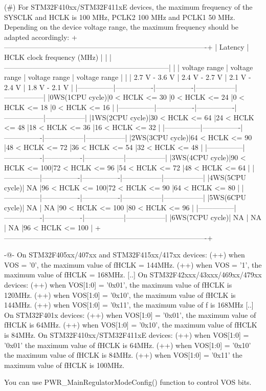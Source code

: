 \begin{DoxyVerb}
      (#) For STM32F410xx/STM32F411xE devices, the maximum frequency of the SYSCLK and HCLK is 100 MHz, 
          PCLK2 100 MHz and PCLK1 50 MHz. Depending on the device voltage range, the maximum 
          frequency should be adapted accordingly:
 +-------------------------------------------------------------------------------------+
 | Latency       |                HCLK clock frequency (MHz)                           |
 |               |---------------------------------------------------------------------|
 |               | voltage range  | voltage range  | voltage range   | voltage range   |
 |               | 2.7 V - 3.6 V  | 2.4 V - 2.7 V  | 2.1 V - 2.4 V   | 1.8 V - 2.1 V   |
 |---------------|----------------|----------------|-----------------|-----------------|
 |0WS(1CPU cycle)|0 < HCLK <= 30  |0 < HCLK <= 24  |0 < HCLK <= 18   |0 < HCLK <= 16   |
 |---------------|----------------|----------------|-----------------|-----------------|
 |1WS(2CPU cycle)|30 < HCLK <= 64 |24 < HCLK <= 48 |18 < HCLK <= 36  |16 < HCLK <= 32  |
 |---------------|----------------|----------------|-----------------|-----------------|
 |2WS(3CPU cycle)|64 < HCLK <= 90 |48 < HCLK <= 72 |36 < HCLK <= 54  |32 < HCLK <= 48  |
 |---------------|----------------|----------------|-----------------|-----------------|
 |3WS(4CPU cycle)|90 < HCLK <= 100|72 < HCLK <= 96 |54 < HCLK <= 72  |48 < HCLK <= 64  |
 |---------------|----------------|----------------|-----------------|-----------------|
 |4WS(5CPU cycle)|      NA        |96 < HCLK <= 100|72 < HCLK <= 90  |64 < HCLK <= 80  |
 |---------------|----------------|----------------|-----------------|-----------------|
 |5WS(6CPU cycle)|      NA        |       NA       |90 < HCLK <= 100 |80 < HCLK <= 96  |
 |---------------|----------------|----------------|-----------------|-----------------|
 |6WS(7CPU cycle)|      NA        |       NA       |        NA       |96 < HCLK <= 100 |
 +-------------------------------------------------------------------------------------+
  
      -@- On STM32F405xx/407xx and STM32F415xx/417xx devices: 
           (++) when VOS = '0', the maximum value of fHCLK = 144MHz. 
           (++) when VOS = '1', the maximum value of fHCLK = 168MHz. 
          [..] 
          On STM32F42xxx/43xxx/469xx/479xx devices:
           (++) when VOS[1:0] = '0x01', the maximum value of fHCLK is 120MHz.
           (++) when VOS[1:0] = '0x10', the maximum value of fHCLK is 144MHz.
           (++) when VOS[1:0] = '0x11', the maximum value of f  is 168MHz 
          [..]  
          On STM32F401x devices:
           (++) when VOS[1:0] = '0x01', the maximum value of fHCLK is 64MHz.
           (++) when VOS[1:0] = '0x10', the maximum value of fHCLK is 84MHz.
          On STM32F410xx/STM32F411xE devices:
           (++) when VOS[1:0] = '0x01' the maximum value of fHCLK is 64MHz.
           (++) when VOS[1:0] = '0x10' the maximum value of fHCLK is 84MHz.
           (++) when VOS[1:0] = '0x11' the maximum value of fHCLK is 100MHz.

       You can use PWR_MainRegulatorModeConfig() function to control VOS bits.\end{DoxyVerb}
 

